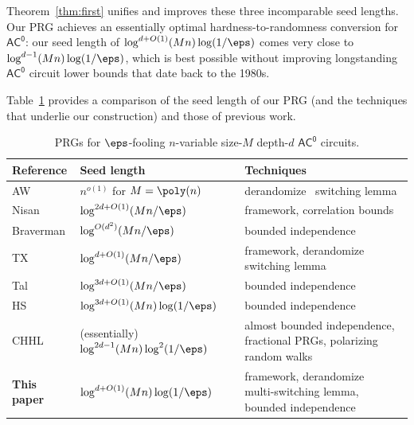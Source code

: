 \documentclass[11pt]{article}
\numberwithin{equation}{section}
\theoremstyle{definition}
\theoremstyle{plain}
\theoremstyle{plain}
\newcommand{\acz}{\mathsf{AC^0}}
\begin{document}
Theorem~\ref{thm:first} unifies and improves these three incomparable seed lengths.  Our PRG  achieves an essentially optimal
%
hardness-to-randomness  %
conversion for $\acz$: our seed length of $\log^{d+O(1)}(Mn) \log(1/\eps)$ comes very close to $\log^{d-1}(Mn)\log(1/\eps)$, which is best possible without improving longstanding $\acz$ circuit lower bounds that date back to the 1980s.
%
%

%
%
%

Table~\ref{table:ac0} provides a comparison of the seed length of our PRG (and the techniques that underlie our construction) and those of previous work. 



\begin{table}[h]
\renewcommand{\arraystretch}{1.6}
\centering
\begin{tabular}{|m{7em}|m{11em}|m{21em}|}
\hline
 Reference &  Seed length & Techniques \\ \hline
\cite{AjtaiWigderson:85} AW & $n^{o(1)}$ for $M=\poly(n)$  & derandomize~\cite{ajtai1983} switching lemma \\ \hline
\cite{Nis91}  Nisan &  $\log^{2d+O(1)}(Mn/\eps)$ & \cite{NW94} framework, \cite{Hastad86} correlation bounds \\ \hline
\cite{Bra10} Braverman & $\log^{O(d^2)}(Mn/\eps)$ & bounded independence\\ \hline 
%
%
\cite{TX13} TX & $\log^{d+O(1)}(Mn/\eps)$ & \cite{AjtaiWigderson:85} framework, derandomize~\cite{Hastad86} switching lemma\\ \hline  
\cite{Tal:15tightbounds} Tal & $\log^{3d+O(1)}(Mn/\eps)$ & bounded independence \\ \hline
\cite{HS16journal} HS & $\log^{3d+O(1)}(Mn)  \log(1/\eps)$ & bounded independence 
\\ \hline
\cite{CHHL18journal} CHHL & (essentially) $\log^{2d-1}(Mn)  \log^2(1/\eps)$ & almost bounded independence, fractional PRGs, polarizing random walks
\\ \hline \hline
%
{\bf This paper}  %
& $\log^{d+O(1)}(Mn) \log(1/\eps)$ & \cite{AjtaiWigderson:85} framework, derandomize~\cite{Has14} multi-switching lemma,
bounded independence\\ \hline
 \end{tabular}
 \caption{PRGs for $\eps$-fooling $n$-variable size-$M$ depth-$d$ $\acz$ circuits.}
 \label{table:ac0}
 \end{table}
 
 
 
%
%
%
%
%
%
%
%
%
%
%
%
%
%
%
%
\end{document}
